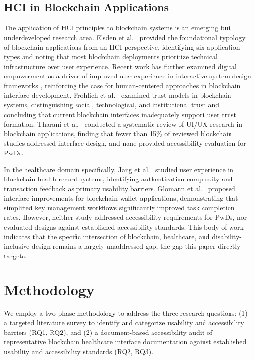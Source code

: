 \documentclass[journal,onecolumn]{IEEEtran}
\begin{document}
\subsection{HCI in Blockchain Applications}
The application of HCI principles to blockchain systems is an emerging but underdeveloped research area. Elsden et al.~\cite{elsden2018making} provided the foundational typology of blockchain applications from an HCI perspective, identifying six application types and noting that most blockchain deployments prioritize technical infrastructure over user experience. Recent work has further examined digital empowerment as a driver of improved user experience in interactive system design frameworks \cite{wang2025digital}, reinforcing the case for human-centered approaches in blockchain interface development. Frohlich et al.~\cite{frohlich2022blockchain} examined trust models in blockchain systems, distinguishing social, technological, and institutional trust and concluding that current blockchain interfaces inadequately support user trust formation. Tharani et al.~\cite{tharani2022ui} conducted a systematic review of UI/UX research in blockchain applications, finding that fewer than 15\% of reviewed blockchain studies addressed interface design, and none provided accessibility evaluation for PwDs.

In the healthcare domain specifically, Jang et al.~\cite{jang2020user} studied user experience in blockchain health record systems, identifying authentication complexity and transaction feedback as primary usability barriers. Glomann et al.~\cite{Glomann2019ImprovingTB} proposed interface improvements for blockchain wallet applications, demonstrating that simplified key management workflows significantly improved task completion rates. However, neither study addressed accessibility requirements for PwDs, nor evaluated designs against established accessibility standards. This body of work indicates that the specific intersection of blockchain, healthcare, and disability-inclusive design remains a largely unaddressed gap, the gap this paper directly targets.


\section{Methodology}
\label{sec:methodology}

We employ a two-phase methodology to address the three research questions: (1) a targeted literature survey to identify and categorize usability and accessibility barriers (RQ1, RQ2), and (2) a document-based accessibility audit of representative blockchain healthcare interface documentation against established usability and accessibility standards (RQ2, RQ3).
\end{document}
